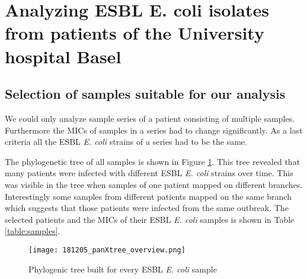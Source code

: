 \section{Analyzing ESBL E. coli isolates from patients of the University hospital Basel}
\subsection{Selection of samples suitable for our analysis}
We could only analyze sample series of a patient consisting of multiple samples. Furthermore the MICs of samples in a series had to change significantly. As a last criteria all the ESBL \textit{E. coli} strains of a series had to be the same.

The phylogenetic tree of all samples is shown in Figure \ref{figure:panX}. This tree revealed that many patients were infected with different ESBL \textit{E. coli} strains over time. This was visible in the tree when samples of one patient mapped on different branches. Interestingly some samples from different patients mapped on the same branch which suggests that those patients were infected from the same outbreak. The selected patients and the MICs of their ESBL \textit{E. coli} samples is shown in Table \ref{table:samples}.

\begin{figure}
	\texttt{[image: 181205\_panXtree\_overview.png]}
	\caption{Phylogenic tree built for every ESBL \textit{E. coli} sample}
	\label{figure:panX}
\end{figure}


